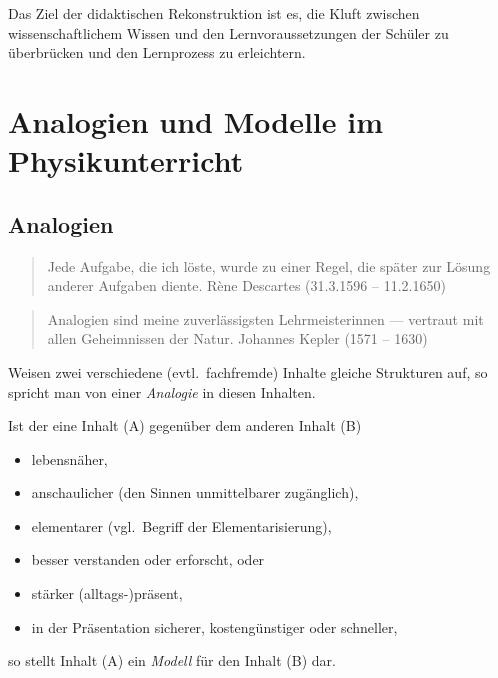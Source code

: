 Das Ziel der didaktischen Rekonstruktion ist es, die Kluft zwischen wissenschaftlichem Wissen und den Lernvoraussetzungen der Sch\"{u}ler zu \"{u}berbr\"{u}cken und den Lernprozess zu erleichtern.



\bip\bip
\section{Analogien und Modelle im Physikunterricht}




\subsection{Analogien}

\begin{quote}
Jede Aufgabe, die ich l\"{o}ste, wurde zu einer Regel, die
sp\"{a}ter zur L\"{o}sung anderer Aufgaben diente.
\q\q R\`ene Descartes (31.3.1596 -- 11.2.1650)
\end{quote}

\begin{quote}
Analogien sind meine zuverl\"{a}ssigsten Lehrmeisterinnen ---
vertraut mit allen Geheimnissen der Natur.
\q\q Johannes Kepler (1571 -- 1630)
\end{quote}

 Weisen zwei verschiedene (evtl.\ fachfremde) Inhalte gleiche
Strukturen auf, so spricht man von einer \textit{Analogie} in diesen
Inhalten.

\bip
Ist der eine Inhalt (A) gegen\"{u}ber dem anderen Inhalt (B)
\begin{itemize}
\setlength{\itemsep}{0mm}
\item
lebensn\"{a}her,
\item
anschaulicher (den Sinnen unmittelbarer zug\"{a}nglich),
\item
elementarer (vgl.\ Begriff der Elementarisierung),
\item
besser verstanden oder erforscht, \q\q oder
\item
st\"{a}rker (alltags-)pr\"{a}sent,
\item
in der Pr\"{a}sentation sicherer, kosteng\"{u}nstiger oder schneller,
\end{itemize}

so stellt Inhalt (A) ein \textit{Modell} f\"{u}r den Inhalt (B) dar.

